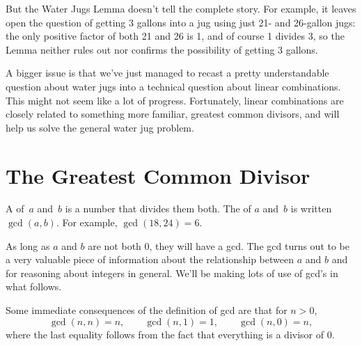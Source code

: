 But the Water Jugs Lemma doesn't tell the complete story.  For
example, it leaves open the question of getting 3 gallons into a jug
using just 21- and 26-gallon jugs: the only positive factor of both 21
and 26 is 1, and of course 1 divides 3, so the Lemma neither rules out
nor confirms the possibility of getting 3 gallons.

A bigger issue is that we've just managed to recast a pretty
understandable question about water jugs into a technical question
about linear combinations.  This might not seem like a lot of
progress.  Fortunately, linear combinations are closely related to
something more familiar, greatest common divisors, and
will help us solve the general water jug problem.

\begin{problems}
\practiceproblems
{}

\classproblems
{}

\end{problems}

\section{The Greatest Common Divisor}\label{sec:gcd}

A  of~$a$ and~$b$ is a number that divides them
both.  The  of $a$ and~$b$ is written
 $\gcd(a, b)$.  For example, $\gcd(18, 24) = 6$.

As long as $a$ and $b$ are not both 0, they will have a gcd. The gcd
turns out to be a very valuable piece of information about the
relationship between $a$ and $b$ and for reasoning about integers in
general.  We'll be making lots of use of gcd's in what follows.

Some immediate consequences of the definition of gcd are that for $n > 0$,
\[
\gcd(n, n) = n, \qquad \gcd(n, 1) = 1, \qquad  \gcd(n,0) = n,
\]
where the last equality follows from the fact that everything is a
divisor of 0.

